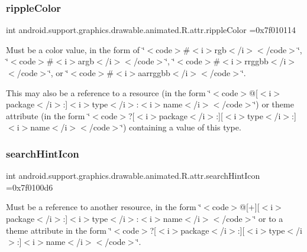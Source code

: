 \subsubsection{\texorpdfstring{ripple\+Color}{rippleColor}}
{\footnotesize\ttfamily int android.\+support.\+graphics.\+drawable.\+animated.\+R.\+attr.\+ripple\+Color =0x7f010114\hspace{0.3cm}{\ttfamily [static]}}

Must be a color value, in the form of \char`\"{}$<$code$>$\#$<$i$>$rgb$<$/i$>$$<$/code$>$\char`\"{}, \char`\"{}$<$code$>$\#$<$i$>$argb$<$/i$>$$<$/code$>$\char`\"{}, \char`\"{}$<$code$>$\#$<$i$>$rrggbb$<$/i$>$$<$/code$>$\char`\"{}, or \char`\"{}$<$code$>$\#$<$i$>$aarrggbb$<$/i$>$$<$/code$>$\char`\"{}. 

This may also be a reference to a resource (in the form \char`\"{}$<$code$>$@\mbox{[}$<$i$>$package$<$/i$>$\+:\mbox{]}$<$i$>$type$<$/i$>$\+:$<$i$>$name$<$/i$>$$<$/code$>$\char`\"{}) or theme attribute (in the form \char`\"{}$<$code$>$?\mbox{[}$<$i$>$package$<$/i$>$\+:\mbox{]}\mbox{[}$<$i$>$type$<$/i$>$\+:\mbox{]}$<$i$>$name$<$/i$>$$<$/code$>$\char`\"{}) containing a value of this type. \mbox{\label{classandroid_1_1support_1_1graphics_1_1drawable_1_1animated_1_1R_1_1attr_a636b74fcad1e952ad0235e10f94b9322}} 
\subsubsection{\texorpdfstring{search\+Hint\+Icon}{searchHintIcon}}
{\footnotesize\ttfamily int android.\+support.\+graphics.\+drawable.\+animated.\+R.\+attr.\+search\+Hint\+Icon =0x7f0100d6\hspace{0.3cm}{\ttfamily [static]}}

Must be a reference to another resource, in the form \char`\"{}$<$code$>$@\mbox{[}+\mbox{]}\mbox{[}$<$i$>$package$<$/i$>$\+:\mbox{]}$<$i$>$type$<$/i$>$\+:$<$i$>$name$<$/i$>$$<$/code$>$\char`\"{} or to a theme attribute in the form \char`\"{}$<$code$>$?\mbox{[}$<$i$>$package$<$/i$>$\+:\mbox{]}\mbox{[}$<$i$>$type$<$/i$>$\+:\mbox{]}$<$i$>$name$<$/i$>$$<$/code$>$\char`\"{}. \mbox{\label{classandroid_1_1support_1_1graphics_1_1drawable_1_1animated_1_1R_1_1attr_a0ed748bfb2acb60da8ebcdec57c76efc}} 
